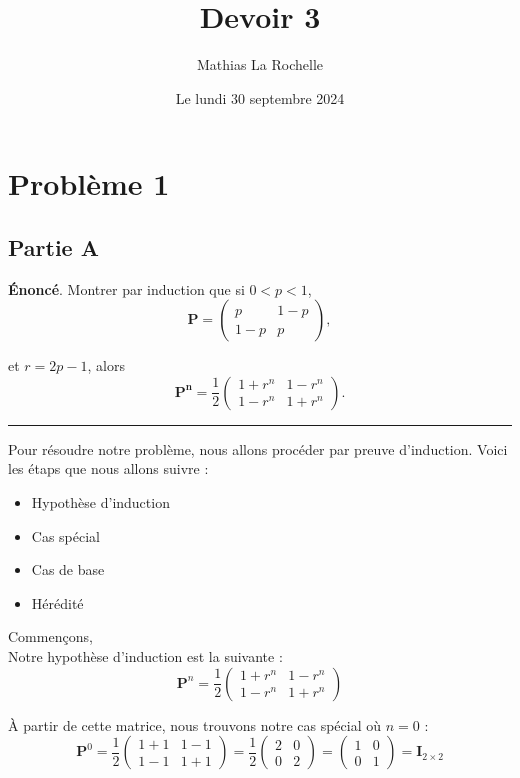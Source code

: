 \documentclass{article}
\title{Devoir 3}
\author{Mathias La Rochelle}
\date{Le lundi 30 septembre 2024}
\begin{document}
\maketitle

\section*{Problème 1}
\subsection*{Partie A}
    \textbf{Énoncé}. Montrer par induction que si \(0 < p < 1\),
    \[
        \boldsymbol{P} = \begin{pmatrix}
            p & 1 - p \\
            1 - p & p
        \end{pmatrix},
    \]

    \noindent et \(r = 2p - 1\), alors
    \[
        \boldsymbol{P^n} = \frac{1}{2} \begin{pmatrix}
            1 + r^n & 1 - r^n \\
            1 - r^n & 1 + r^n
        \end{pmatrix}.
    \]

    \vspace{.5cm}
    \hrule
    \vspace{.5cm}

    Pour résoudre notre problème, nous allons procéder par preuve d'induction. Voici les étaps que nous allons suivre :
    \begin{itemize}
        \item Hypothèse d'induction
        \item Cas spécial
        \item Cas de base
        \item Hérédité
    \end{itemize}

    \vspace{.3cm}
    \noindent Commençons, \\

    Notre hypothèse d'induction est la suivante :
    \[
        \boldsymbol{P}^n = \frac{1}{2} \begin{pmatrix}
            1 + r^n & 1 - r^n \\
            1 - r^n & 1 + r^n
        \end{pmatrix}
    \]

    À partir de cette matrice, nous trouvons notre cas spécial où \(n = 0\) :
    \[
        \boldsymbol{P}^0 = \frac{1}{2} \begin{pmatrix}
            1 + 1 & 1 - 1 \\
            1 - 1 & 1 + 1
        \end{pmatrix} 
        = 
        \frac{1}{2} \begin{pmatrix} 2 & 0 \\ 0 & 2 \end{pmatrix}
        = \begin{pmatrix} 1 & 0 \\ 0 & 1 \end{pmatrix}
        = \boldsymbol{I}_{2 \times 2}
    \]
\end{document}
